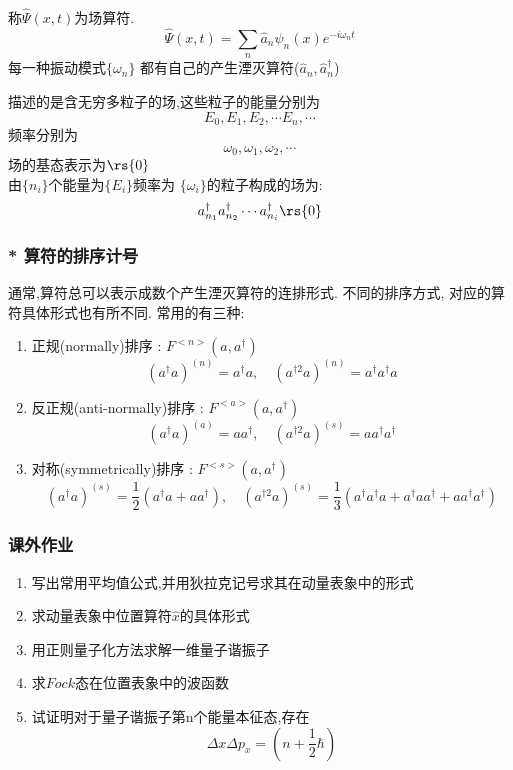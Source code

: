 \begin{frame} 
\frametitle{}
称$\hat{\Psi } (x,t)$为场算符. 
\[ \hat{\Psi } (x,t) = \sum_n \hat{a}_n \psi_n(x) e^{-i \omega_n t}\]      
每一种振动模式$\{ \omega_n \}$ 都有自己的产生湮灭算符($\hat{a}_n, \hat{a}^{\dagger} _n$)\\ \vspace*{0.6em}

描述的是含无穷多粒子的场,这些粒子的能量分别为
\[ E_0, E_1, E_2, \cdots E_n, \cdots \]
频率分别为\[\omega_0, \omega_1, \omega_2, \cdots\] 
场的基态表示为$\rs{0}$ \\ 
由$\{n_i\}$个能量为$\{E_i\}$频率为 $\{\omega_i\}$的粒子构成的场为:
\[ a^{\dagger} _{n_1} a^{\dagger} _{n_2}\cdots a^{\dagger} _{n_i} \rs{0}\]
\end{frame}

\begin{frame} 
    \frametitle{* 算符的排序计号}
    通常,算符总可以表示成数个产生湮灭算符的连排形式. 不同的排序方式, 对应的算符具体形式也有所不同. 常用的有三种: \\
    \begin{enumerate}
      \item 正规(normally)排序 : ${F}^{<n>} (a, a^{\dagger})$ \[ (a^{\dagger} a)^{(n)} = a^{\dagger} a, \quad (a^{\dagger 2} a)^{(n)} = a^{\dagger} a^{\dagger} a\]
      \item 反正规(anti-normally)排序 : ${F}^{<a>} (a, a^{\dagger})$ \[ (a^{\dagger} a)^{(a)} = aa^{\dagger} , \quad (a^{\dagger 2} a)^{(s)} = a a^{\dagger} a^{\dagger} \]
      \item 对称(symmetrically)排序 : ${F}^{<s>} (a, a^{\dagger})$ \[ (a^{\dagger} a)^{(s)} = \frac{1}{2}(a^{\dagger} a + aa^{\dagger}) , \quad (a^{\dagger 2} a)^{(s)} = \frac{1}{3}(a^{\dagger} a^{\dagger} a+  a^{\dagger} a a^{\dagger} + a a^{\dagger} a^{\dagger} ) \]
    \end{enumerate}
\end{frame}

\begin{frame}
    \frametitle{课外作业}
    \begin{enumerate}
        \item 写出常用平均值公式,并用狄拉克记号求其在动量表象中的形式
        \item 求动量表象中位置算符$\hat{x}$的具体形式
        \item 用正则量子化方法求解一维量子谐振子
        \item 求$Fock$态在位置表象中的波函数
        \item 试证明对于量子谐振子第n个能量本征态,存在 
                \[  \Delta x \Delta p_x = (n+\frac{1}{2}\hbar)   \]
    \end{enumerate}
\end{frame}
